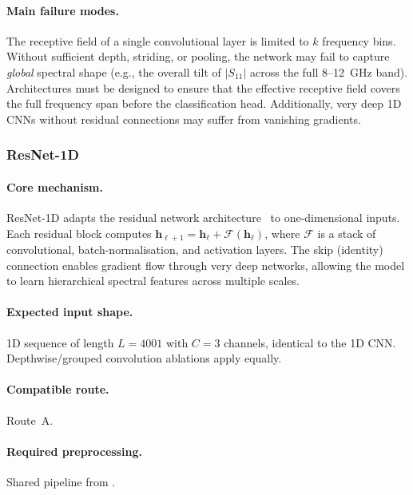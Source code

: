 \paragraph{Main failure modes.}
The receptive field of a single convolutional layer is limited to $k$
frequency bins.  Without sufficient depth, striding, or pooling, the
network may fail to capture \emph{global} spectral shape (e.g., the
overall tilt of $|S_{11}|$ across the full \SI{8}{}--\SI{12}{\giga\hertz}
band).  Architectures must be designed to ensure that the effective
receptive field covers the full frequency span before the classification
head.  Additionally, very deep 1D CNNs without residual connections may
suffer from vanishing gradients.


\subsubsection{ResNet-1D}\label{subsec:resnet1d}

\paragraph{Core mechanism.}
ResNet-1D adapts the residual network architecture~\cite{he2016resnet}
to one-dimensional inputs.  Each residual block computes
$\mathbf{h}_{\ell+1} = \mathbf{h}_\ell + \mathcal{F}(\mathbf{h}_\ell)$,
where $\mathcal{F}$ is a stack of convolutional, batch-normalisation,
and activation layers.  The skip (identity) connection enables gradient
flow through very deep networks, allowing the model to learn
hierarchical spectral features across multiple scales.

\paragraph{Expected input shape.}
1D sequence of length $L = 4001$ with $C = 3$ channels, identical to the
1D CNN.  Depthwise/grouped convolution ablations apply equally.

\paragraph{Compatible route.}
Route~A.

\paragraph{Required preprocessing.}
Shared pipeline from .

